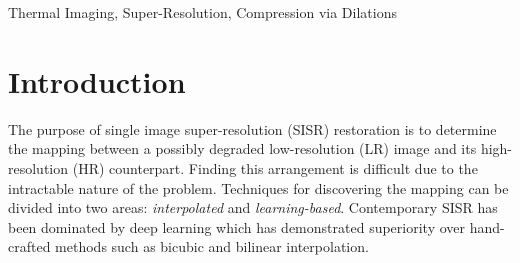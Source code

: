 \documentclass[runningheads]{llncs}
\begin{document}
\begin{keywords}
Thermal Imaging, Super-Resolution, Compression via Dilations 
\end{keywords}

\section{Introduction}
\label{sec:introduction}
The purpose of single image super-resolution (SISR) restoration is to determine
the mapping between a possibly degraded low-resolution (LR) image and its
high-resolution (HR) counterpart. Finding this arrangement is difficult due to
the intractable nature of the problem. Techniques for discovering the mapping
can be divided into two areas: {\em interpolated} and {\em learning-based}.
Contemporary SISR has been dominated by deep learning which has demonstrated
superiority over hand-crafted methods such as bicubic and bilinear
interpolation.



\end{document}
